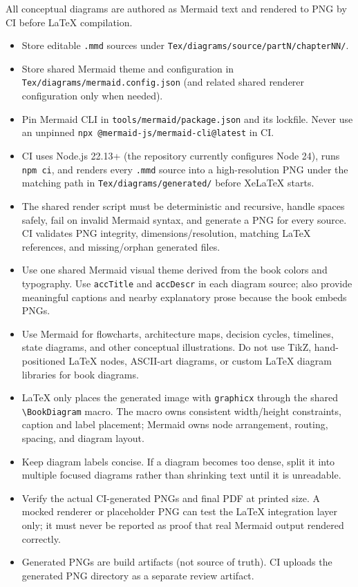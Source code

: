 All conceptual diagrams are authored as Mermaid text and rendered to PNG
by CI before LaTeX compilation.

\begin{itemize}
\tightlist
\item
  Store editable \texttt{.mmd} sources under
  \texttt{Tex/diagrams/source/partN/chapterNN/}.
\item
  Store shared Mermaid theme and configuration in
  \texttt{Tex/diagrams/mermaid.config.json} (and related shared renderer
  configuration only when needed).
\item
  Pin Mermaid CLI in \texttt{tools/mermaid/package.json} and its
  lockfile. Never use an unpinned
  \texttt{npx\ @mermaid-js/mermaid-cli@latest} in CI.
\item
  CI uses Node.js 22.13+ (the repository currently configures Node 24),
  runs \texttt{npm\ ci}, and renders every \texttt{.mmd} source into a
  high-resolution PNG under the matching path in
  \texttt{Tex/diagrams/generated/} before XeLaTeX starts.
\item
  The shared render script must be deterministic and recursive, handle
  spaces safely, fail on invalid Mermaid syntax, and generate a PNG for
  every source. CI validates PNG integrity, dimensions/resolution,
  matching LaTeX references, and missing/orphan generated files.
\item
  Use one shared Mermaid visual theme derived from the book colors and
  typography. Use \texttt{accTitle} and \texttt{accDescr} in each
  diagram source; also provide meaningful captions and nearby
  explanatory prose because the book embeds PNGs.
\item
  Use Mermaid for flowcharts, architecture maps, decision cycles,
  timelines, state diagrams, and other conceptual illustrations. Do not
  use TikZ, hand-positioned LaTeX nodes, ASCII-art diagrams, or custom
  LaTeX diagram libraries for book diagrams.
\item
  LaTeX only places the generated image with \texttt{graphicx} through
  the shared \texttt{\textbackslash{}BookDiagram} macro. The macro owns
  consistent width/height constraints, caption and label placement;
  Mermaid owns node arrangement, routing, spacing, and diagram layout.
\item
  Keep diagram labels concise. If a diagram becomes too dense, split it
  into multiple focused diagrams rather than shrinking text until it is
  unreadable.
\item
  Verify the actual CI-generated PNGs and final PDF at printed size. A
  mocked renderer or placeholder PNG can test the LaTeX integration
  layer only; it must never be reported as proof that real Mermaid
  output rendered correctly.
\item
  Generated PNGs are build artifacts (not source of truth). CI uploads
  the generated PNG directory as a separate review artifact.
\end{itemize}

